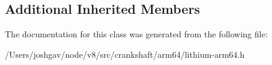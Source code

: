 \subsection*{Additional Inherited Members}


The documentation for this class was generated from the following file\+:\begin{DoxyCompactItemize}
\item 
/\+Users/joshgav/node/v8/src/crankshaft/arm64/lithium-\/arm64.\+h\end{DoxyCompactItemize}
